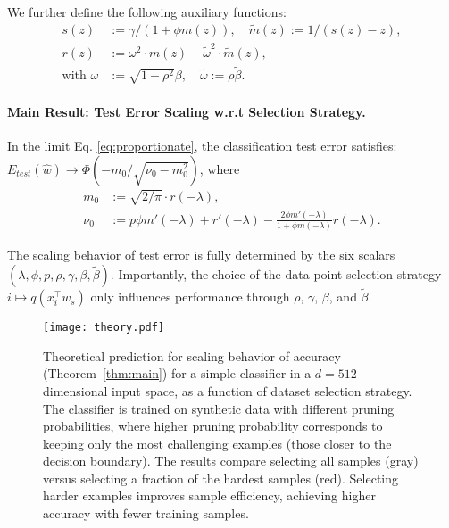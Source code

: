 We further define the following auxiliary functions:
{
\begin{align}
    s(z) &:= \gamma/(1+\phi m(z)),\quad
    \tilde m(z) := 1/(s(z)-z), \\
    r(z) &:= \omega^2\cdot m(z) + \tilde\omega ^2\cdot \tilde m(z),\\
    \text{with }\omega&:=\sqrt{1-\rho^2}\beta,\quad \tilde\omega := \rho\tilde\beta.
\end{align}}

\paragraph{Main Result: Test Error Scaling w.r.t Selection Strategy.}
\begin{theorem}
\label{thm:main}
   In the limit Eq. \eqref{eq:proportionate}, the classification test error satisfies: $E_{test}(\hat{w}) \to \Phi\left(-m_0/\sqrt{\nu_0 - m_0^2}\right)$, where
    \begin{align*}
        m_0 &:= \sqrt{2/\pi} \cdot r(-\lambda),\\
        \nu_0 &:= p\phi m'(-\lambda) + r'(-\lambda) - \frac{2\phi m'(-\lambda)}{1+\phi m(-\lambda)} r(-\lambda).
    \end{align*}
\end{theorem}
The scaling behavior of test error is fully determined by the six scalars $(\lambda, \phi, p, \rho, \gamma, \beta,\tilde\beta)$. Importantly, the choice of the data point selection strategy $i \mapsto q(x_i^\top w_s)$ only influences performance through $\rho$, $\gamma$, $\beta$, and $\tilde \beta$.

\begin{figure}[t!]
    \centering
    \begin{minipage}{0.4\textwidth}
        \texttt{[image: theory.pdf]}
    \end{minipage}
    \hfill
    \begin{minipage}{0.55\textwidth}
    \caption{Theoretical prediction for scaling behavior of accuracy (Theorem~\ref{thm:main}) for a simple classifier in a $d=512$ dimensional input space, as a function of dataset selection strategy. The classifier is trained on synthetic data with different pruning probabilities, where higher pruning probability corresponds to keeping only the most challenging examples (those closer to the decision boundary). The results compare selecting all samples (gray) versus selecting a fraction of the hardest samples (red). Selecting harder examples improves sample efficiency, achieving higher accuracy with fewer training samples.}
        \label{fig:theory_scaling}
    \end{minipage}
\end{figure}


